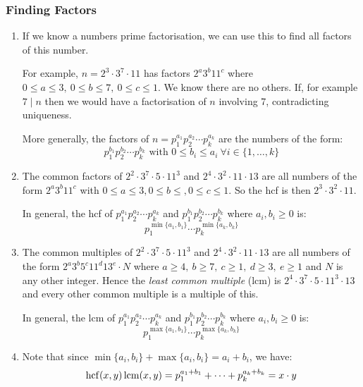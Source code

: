 \documentclass[../main.tex]{subfiles}
\begin{document}
\subsubsection{Finding Factors}
\begin{enumerate}
  \item If we know a numbers prime factorisation, we can use this to find all factors of this number.

    For example, $n = 2^{3} \cdot 3^{7} \cdot 11$ has factors $2^{a}3^{b}11^{c}$ where $0 \leq a \leq3,\ 0 \leq b \leq7,\ 0 \leq c \leq 1$.
    We know there are no others.
    If, for example $7 \mid n$ then we would have a factorisation of $n$ involving 7, contradicting uniqueness.

    More generally, the factors of $n = p^{a_1}_{1} p^{a_2}_{2} \cdots p^{a_k}_{k}$ are the numbers of the form:
    \[
      p^{b_1}_{1} p^{b_2}_{2} \cdots p^{b_k}_{k} \text{ with } 0\leq b_i \leq a_i\ \forall i \in \{1, \ldots, k\}
    \]
  \item The common factors of $2^{2} \cdot 3^{7} \cdot 5 \cdot 11^{3}$ and $2^{4} \cdot 3^{2} \cdot 11 \cdot 13$ are all numbers of the form $2^{a}3^{b}11^{c}$ with $0 \leq a \leq 3, 0\leq b \leq , 0\leq c\leq 1$.
    So the hcf is then $2^{3} \cdot 3^{2} \cdot 11$.

    In general, the hcf of $p^{a_1}_{1} p^{a_2}_{2} \cdots p^{a_k}_{k}$ and $p^{b_1}_{1} p^{b_2}_{2} \cdots p^{b_k}_{k}$ where $a_i, b_i \geq 0$ is:
    \[
      p^{\min\{a_1, b_1\}}_{1} \cdots p^{\min\{a_k, b_k\}}_{k}
    \]
  \item The common multiples of $2^{2} \cdot 3^{7} \cdot 5 \cdot 11^{3}$ and $2^{4} \cdot 3^{2} \cdot 11 \cdot 13$ are all numbers of the form $2^{a}3^{b}5^{c}11^{d}13^{e} \cdot N$ where $a \geq 4,\ b \geq 7,\ c \geq 1,\ d\geq 3,\ e\geq 1$ and $N$ is any other integer.
    Hence the \textit{least common multiple} (lcm) is $2^{4} \cdot 3^{7} \cdot 5 \cdot 11^{3} \cdot 13$ and every other common multiple is a multiple of this.


    In general, the lcm of $p^{a_1}_{1} p^{a_2}_{2} \cdots p^{a_k}_{k}$ and $p^{b_1}_{1} p^{b_2}_{2} \cdots p^{b_k}_{k}$ where $a_i, b_i \geq 0$ is:
    \[
      p^{\max\{a_1, b_1\}}_{1} \cdots p^{\max\{a_k, b_k\}}_{k}
    \]
  \item Note that since $\min\{a_i, b_i\} + \max\{a_i, b_i\} = a_i + b_i$, we have:
    \[
      \operatorname{hcf}(x, y)\operatorname{lcm}(x, y) = p^{a_1 + b_1}_{1} + \cdots + p^{a_k + b_k}_{k} = x \cdot y
    \]
\end{enumerate}
\end{document}
